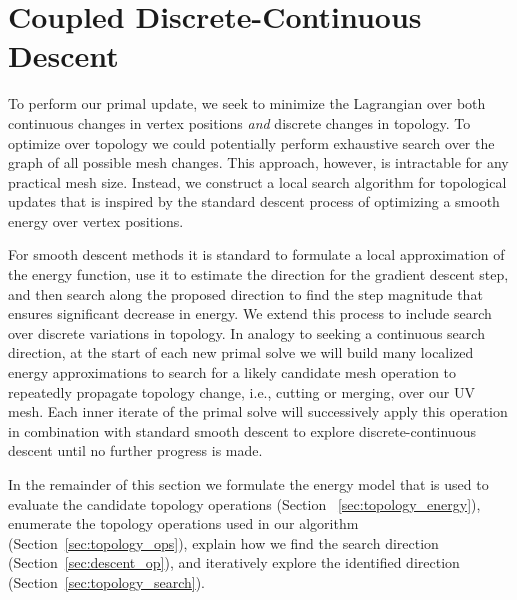 
\section{Coupled Discrete-Continuous Descent}
\label{sec:topologySearch}
To perform our primal update, we seek to minimize the Lagrangian over both continuous changes in vertex positions \emph{and} discrete changes in topology. 
%
To optimize over topology we could potentially perform exhaustive search over the graph of all possible mesh changes. This approach, however, is intractable for any practical mesh size. 
%
Instead, we construct a local search algorithm for topological updates that is inspired by the standard descent process of optimizing a smooth energy over vertex positions. 

%
For smooth descent methods it is standard to formulate a local approximation of the energy function, use it to estimate the direction for the gradient descent step, and then search along the proposed direction to find the step magnitude that ensures significant decrease in energy. 
%
We extend this process to include search over discrete variations in topology. In analogy to seeking a continuous search direction, at the start of each new primal solve we will build many localized energy approximations to search for a likely candidate mesh operation to repeatedly propagate topology change, i.e., cutting or merging, over our UV mesh. Each inner iterate of the primal solve will successively apply this operation in combination with standard smooth descent to explore discrete-continuous descent until no further progress is made.%

In the remainder of this section we formulate the energy model that is used to evaluate the candidate topology operations (Section ~\ref{sec:topology_energy}), 
enumerate the topology operations used in our algorithm (Section~\ref{sec:topology_ops}), explain how we find the search direction (Section~\ref{sec:descent_op}), and iteratively explore the identified direction (Section~\ref{sec:topology_search}).

